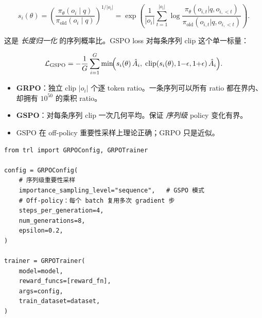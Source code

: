 \[
\boxed{
    s_i(\theta) = \left(\frac{\pi_\theta(o_i \mid q)}{\pi_{\text{old}}(o_i \mid q)}\right)^{1/|o_i|}
    = \exp\!\left(\frac{1}{|o_i|}\sum_{t=1}^{|o_i|} \log \frac{\pi_\theta(o_{i,t}|q,o_{i,<t})}{\pi_{\text{old}}(o_{i,t}|q,o_{i,<t})}\right).
  }
\]

这是 \emph{长度归一化} 的序列概率比。GSPO loss 对每条序列 clip 这个单一标量：

\[
\mathcal{L}_{\text{GSPO}} = -\frac{1}{G}\sum_{i=1}^G
    \min\!\Bigl(s_i(\theta)\,\hat{A}_i,\;
               \mathrm{clip}(s_i(\theta),1{-}\epsilon,1{+}\epsilon)\,\hat{A}_i\Bigr).
\]

\begin{keybox}
\begin{itemize}
  \item \textbf{GRPO}：独立 clip $|o_i|$ 个逐 token ratio。一条序列可以所有 ratio 都在界内、却拥有 $10^{50}$ 的乘积 ratio。
  \item \textbf{GSPO}：对每条序列 clip 一次几何平均。保证 \emph{序列级} policy 变化有界。
  \item GSPO 在 off-policy 重要性采样上理论正确；GRPO 只是近似。
\end{itemize}
\end{keybox}

\begin{examplebox}
\begin{lstlisting}[style=pythonstyle]
from trl import GRPOConfig, GRPOTrainer

config = GRPOConfig(
    # 序列级重要性采样
    importance_sampling_level="sequence",   # GSPO 模式
    # Off-policy：每个 batch 复用多次 gradient 步
    steps_per_generation=4,
    num_generations=8,
    epsilon=0.2,
)

trainer = GRPOTrainer(
    model=model,
    reward_funcs=[reward_fn],
    args=config,
    train_dataset=dataset,
)
\end{lstlisting}
\end{examplebox}


